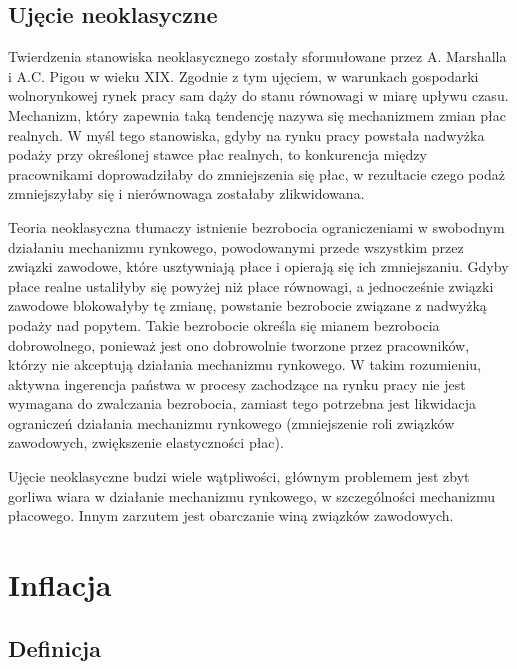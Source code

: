 \documentclass[12pt]{extarticle}
\begin{document}
\subsection{Ujęcie neoklasyczne}

Twierdzenia stanowiska neoklasycznego zostały sformułowane przez A. Marshalla i A.C. Pigou w wieku XIX. Zgodnie z tym ujęciem, w warunkach gospodarki wolnorynkowej rynek pracy sam dąży do stanu równowagi w miarę upływu czasu. Mechanizm, który zapewnia taką tendencję nazywa się mechanizmem zmian płac realnych. W myśl tego stanowiska, gdyby na rynku pracy powstała nadwyżka podaży przy określonej stawce płac realnych, to konkurencja między pracownikami doprowadziłaby do zmniejszenia się płac, w rezultacie czego podaż zmniejszyłaby się i nierównowaga zostałaby zlikwidowana.

Teoria neoklasyczna tłumaczy istnienie bezrobocia ograniczeniami w swobodnym działaniu mechanizmu rynkowego, powodowanymi przede wszystkim przez związki zawodowe, które usztywniają płace i opierają się ich zmniejszaniu. Gdyby płace realne ustaliłyby się powyżej niż płace równowagi, a jednocześnie związki zawodowe blokowałyby tę zmianę, powstanie bezrobocie związane z nadwyżką podaży nad popytem. Takie bezrobocie określa się mianem bezrobocia dobrowolnego, ponieważ jest ono dobrowolnie tworzone przez pracowników, którzy nie akceptują działania mechanizmu rynkowego. W takim rozumieniu, aktywna ingerencja państwa w procesy zachodzące na rynku pracy nie jest wymagana do zwalczania bezrobocia, zamiast tego potrzebna jest likwidacja ograniczeń działania mechanizmu rynkowego (zmniejszenie roli związków zawodowych, zwiększenie elastyczności płac).

Ujęcie neoklasyczne budzi wiele wątpliwości, głównym problemem jest zbyt gorliwa wiara w działanie mechanizmu rynkowego, w szczególności mechanizmu płacowego. Innym zarzutem jest obarczanie winą związków zawodowych.









\section{Inflacja}

\subsection{Definicja}
\end{document}
